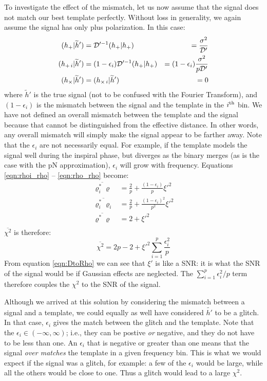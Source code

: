 To investigate the effect of the mismatch, let us now assume that the signal does not match our best template perfectly. Without loss in generality, we again assume the signal has only plus polarization. In this case:
\begin{align}
(h_{+}|\widetilde{h}') &= \mathcal{D}'^{-1}(h_{+}|h_{+}) &= \frac{\sigma^2}{\mathcal{D}'} \\
(h_{+\,i}|\widetilde{h}') &= (1 - \epsilon_i)\mathcal{D}'^{-1}(h_{+}|h_{+}) &= (1 - \epsilon_i) \frac{\sigma^2}{p\mathcal{D}'} \\
(h_{\times}|\widetilde{h}') &= (h_{\times\,i}|\widetilde{h}') &= 0
\end{align}
where $\widetilde{h}'$ is the true signal (not to be confused with the Fourier Transform), and $(1-\epsilon_i)$ is the mismatch between the signal and the template in the $i^{\mathrm{th}}$ bin. We have not defined an overall mismatch between the template and the signal because that cannot be distinguished from the effective distance. In other words, any overall mismatch will simply make the signal appear to be farther away. Note that the $\epsilon_i$ are not necessarily equal. For example, if the template models the signal well during the inspiral phase, but diverges as the binary merges (as is the case with the \ac{pN} approximation), $\epsilon_i$ will grow with frequency. Equations \ref{eqn:rhoi_rho} -- \ref{eqn:rho_rho} become:
\begin{align}
\overline{\varrho_i^{*}\varrho} &= \frac{2}{p} + \frac{(1-\epsilon_i)}{p} \xi'^2 \\
\overline{\varrho_i^{*}\varrho_i} &= \frac{2}{p} + \frac{(1-\epsilon_i)^2}{p^2} \xi'^2 \\
\overline{\varrho^{*}\varrho} &= 2 + \xi'^2 \\
\end{align}
$\overline{\chi^2}$ is therefore:
\begin{equation}
\label{eqn:chisq_mismatch}
\overline{\chi^2} = 2p - 2 + \xi'^2 \sum_{i=1}^{p} \frac{\epsilon_i^2}{p}
\end{equation}
From equation \ref{eqn:DtoRho} we can see that $\xi'$ is like a \ac{SNR}: it is what the \ac{SNR} of the signal would be if Gaussian effects are neglected. The $\sum_{i=1}^{p} \epsilon_i^2/p$ term therefore couples the $\chi^2$ to the \ac{SNR} of the signal.

Although we arrived at this solution by considering the mismatch between a signal and a template, we could equally as well have considered $\widetilde{h'}$ to be a glitch. In that case, $\epsilon_i$ gives the match between the glitch and the template. Note that the $\epsilon_i \in (-\infty,\infty)$; i.e., they can be postive \emph{or} negative, and they do not have to be less than one. An $\epsilon_i$ that is negative or greater than one means that the signal \emph{over matches} the template in a given frequency bin. This is what we would expect if the signal was a glitch, for example: a few of the $\epsilon_i$ would be large, while all the others would be close to one. Thus a glitch would lead to a large $\chi^2$. 

